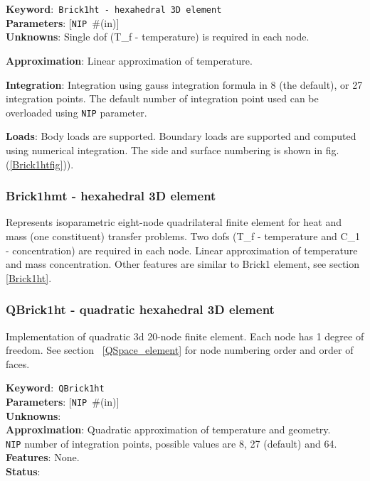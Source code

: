 \documentclass[a4paper]{article}
\newcommand{\descitem}[1]{{\noindent \textbf{#1}}:}
\newcommand{\elemkeyword}[1]{\descitem{Keyword}~\param{#1}} %
\newcommand{\param}[1]{\texttt{#1}} %
\newcommand{\optional}[1]{[#1]} %
\newcommand{\field}[2]{\param{#1}~\#{\tiny(#2)}} %
\newcommand{\optField}[2]{\optional{\field{#1}{#2}}}
\begin{document}
\elemkeyword{Brick1ht - hexahedral 3D element}\\
\descitem{Parameters} \optField{NIP}{in}\\
\descitem{Unknowns}
Single dof (T\_f - temperature) is required in each node.

\descitem{Approximation} Linear approximation of temperature.

\descitem{Integration}
Integration using gauss integration formula
in 8 (the default), or 27 integration points. The default number of
integration point used can be overloaded using \param{NIP} parameter.

\descitem{Loads} Body loads are supported. Boundary loads are
supported and computed using numerical integration. The side and
surface numbering is shown in fig. (\ref{Brick1htfig})).

\subsubsection{Brick1hmt - hexahedral 3D element}
Represents isoparametric eight-node quadrilateral finite element for
heat and mass (one constituent) transfer problems. 
Two dofs (T\_f - temperature and C\_1 - concentration) are required in
each node. Linear approximation of temperature and mass concentration.
Other features are similar to Brick1 element, see section \ref{Brick1ht}.

\subsubsection{QBrick1ht - quadratic hexahedral 3D element}\label{QBrick1ht_element}
Implementation of quadratic 3d 20-node 
finite element. Each node has 1 degree of freedom. See section ~\ref{QSpace_element} 
for node numbering order and order of faces.

\elemkeyword{QBrick1ht}\\
\descitem{Parameters} \optField{NIP}{in}\\
\descitem{Unknowns} \\
\descitem{Approximation} Quadratic approximation of temperature and
geometry.\\
\param{NIP} number of integration points, possible values are 8, 27 (default) and 64.\\
\descitem{Features} None.\\
\descitem{Status} 
\end{document}
